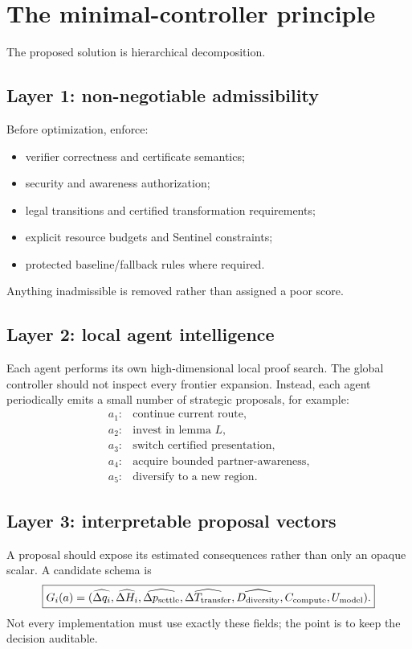 \documentclass[11pt]{article}
\theoremstyle{definition}
\theoremstyle{remark}
\begin{document}
\section{The minimal-controller principle}

The proposed solution is hierarchical decomposition.

\subsection{Layer 1: non-negotiable admissibility}

Before optimization, enforce:
\begin{itemize}
\item verifier correctness and certificate semantics;
\item security and awareness authorization;
\item legal transitions and certified transformation requirements;
\item explicit resource budgets and Sentinel constraints;
\item protected baseline/fallback rules where required.
\end{itemize}
Anything inadmissible is removed rather than assigned a poor score.

\subsection{Layer 2: local agent intelligence}

Each agent performs its own high-dimensional local proof search. The global controller should not inspect every frontier expansion. Instead, each agent periodically emits a small number of strategic proposals, for example:
\[
\begin{array}{ll}
a_1:&\text{continue current route},\\
a_2:&\text{invest in lemma }L,\\
a_3:&\text{switch certified presentation},\\
a_4:&\text{acquire bounded partner-awareness},\\
a_5:&\text{diversify to a new region}.
\end{array}
\]

\subsection{Layer 3: interpretable proposal vectors}

A proposal should expose its estimated consequences rather than only an opaque scalar. A candidate schema is
\[
\boxed{
G_i(a)=
(\widehat{\Delta q_i},
\widehat{\Delta H_i},
\widehat{\Delta p_{\rm settle}},
\widehat{\Delta T_{\rm transfer}},
\widehat{D_{\rm diversity}},
C_{\rm compute},
U_{\rm model}).
}
\]
Not every implementation must use exactly these fields; the point is to keep the decision auditable.
\end{document}
